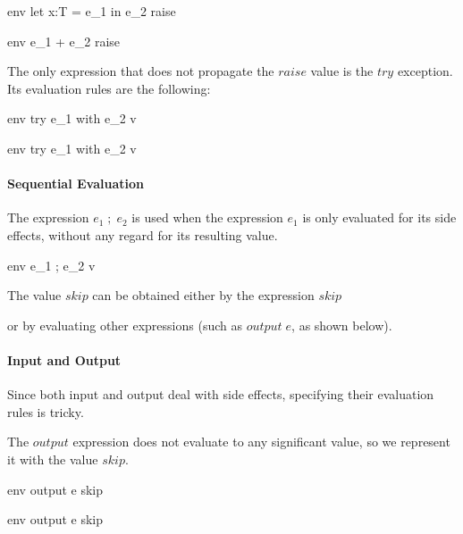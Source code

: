 \documentclass{article}
\begin{document}
    {\mbox{env} \vdash let \; x:T = e_1 \; in \; e_2 \Downarrow raise}

    {\mbox{env} \vdash e_1 + e_2 \Downarrow raise}

The only expression that does not propagate the $raise$ value is the $try$ exception.
Its evaluation rules are the following:

    {\mbox{env} \vdash try \; e_1 \; with \; e_2 \Downarrow v}
    
    {\mbox{env} \vdash try \; e_1 \; with \; e_2 \Downarrow v}

\paragraph{Sequential Evaluation}
The expression $e_1 \; ; \; e_2$ is used when the expression $e_1$ is only evaluated for its side effects, without any regard for its resulting value.

    {\mbox{env} \vdash e_1 \; ; \; e_2 \Downarrow v}
    
The value $skip$ can be obtained either by the expression $skip$

    
or by evaluating other expressions (such as $output \; e$, as shown below).

\paragraph{Input and Output}
Since both input and output deal with side effects, specifying their evaluation rules is tricky.

The $output$ expression does not evaluate to any significant value, so we represent it with the value $skip$.

    {\mbox{env} \vdash output \; e \Downarrow skip}
    
    {\mbox{env} \vdash output \; e \Downarrow skip}
\end{document}
